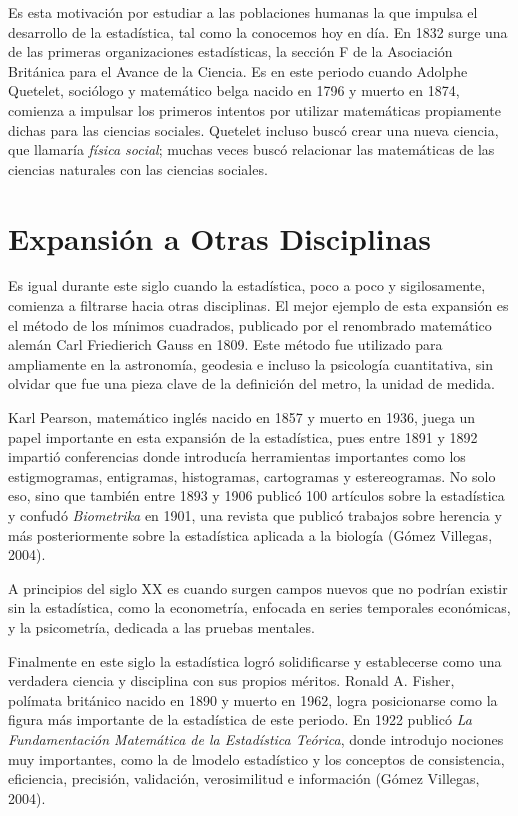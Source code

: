 \documentclass[12pt, a4paper]{article}
\begin{document}
Es esta motivación por estudiar a las poblaciones humanas la que impulsa el desarrollo de la estadística, tal como la conocemos hoy en día. En 1832 surge una de las primeras organizaciones estadísticas, la sección F de la Asociación Británica para el Avance de la Ciencia. Es en este periodo cuando Adolphe Quetelet, sociólogo y matemático belga nacido en 1796 y muerto en 1874, comienza a impulsar los primeros intentos por utilizar matemáticas propiamente dichas para las ciencias sociales. Quetelet incluso buscó crear una nueva ciencia, que llamaría \textit{física social}; muchas veces buscó relacionar las matemáticas de las ciencias naturales con las ciencias sociales.

\section{Expansión a Otras Disciplinas}

Es igual durante este siglo cuando la estadística, poco a poco y sigilosamente, comienza a filtrarse hacia otras disciplinas. El mejor ejemplo de esta expansión es el método de los mínimos cuadrados, publicado por el renombrado matemático alemán Carl Friedierich Gauss en 1809. Este método fue utilizado para ampliamente en la astronomía, geodesia e incluso la psicología cuantitativa, sin olvidar que fue una pieza clave de la definición del metro, la unidad de medida.

Karl Pearson, matemático inglés nacido en 1857 y muerto en 1936, juega un papel importante en esta expansión de la estadística, pues entre 1891 y 1892 impartió conferencias donde introducía herramientas importantes como los estigmogramas, entigramas, histogramas, cartogramas y estereogramas. No solo eso, sino que también entre 1893 y 1906 publicó 100 artículos sobre la estadística y confudó \textit{Biometrika} en 1901, una revista que publicó trabajos sobre herencia y más posteriormente sobre la estadística aplicada a la biología (Gómez Villegas, 2004).

A principios del siglo XX es cuando surgen campos nuevos que no podrían existir sin la estadística, como la econometría, enfocada en series temporales económicas, y la psicometría, dedicada a las pruebas mentales.

Finalmente en este siglo la estadística logró solidificarse y establecerse como una verdadera ciencia y disciplina con sus propios méritos. Ronald A. Fisher, polímata británico nacido en 1890 y muerto en 1962, logra posicionarse como la figura más importante de la estadística de este periodo. En 1922 publicó \textit{La Fundamentación Matemática de la Estadística Teórica}, donde introdujo nociones muy importantes, como la de lmodelo estadístico y los conceptos de consistencia, eficiencia, precisión, validación, verosimilitud e información (Gómez Villegas, 2004).
\end{document}
